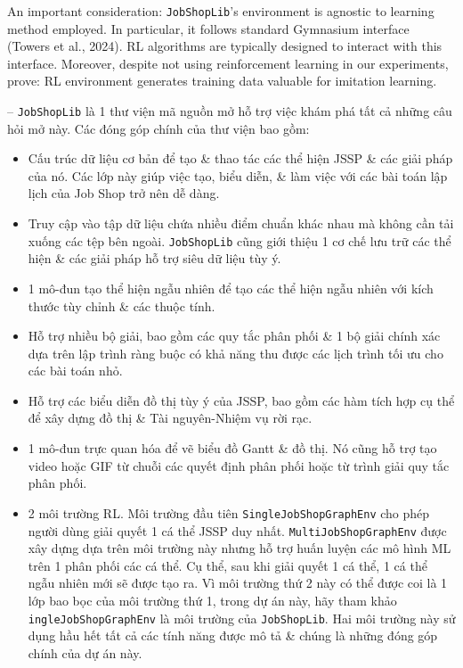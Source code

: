 \documentclass{article}
\begin{document}
\begin{itemize}
\begin{itemize}
\begin{itemize}
\begin{itemize}
            \end{itemize}
            An important consideration: {\tt JobShopLib}'s environment is agnostic to learning method employed. In particular, it follows standard Gymnasium interface (Towers et al., 2024). RL algorithms are typically designed to interact with this interface. Moreover, despite not using reinforcement learning in our experiments, prove: RL environment generates training data valuable for imitation learning.

            -- {\tt JobShopLib} là 1 thư viện mã nguồn mở hỗ trợ việc khám phá tất cả những câu hỏi mở này. Các đóng góp chính của thư viện bao gồm:
            \begin{itemize}
                \item Cấu trúc dữ liệu cơ bản để tạo \& thao tác các thể hiện JSSP \& các giải pháp của nó. Các lớp này giúp việc tạo, biểu diễn, \& làm việc với các bài toán lập lịch của Job Shop trở nên dễ dàng.
                \item Truy cập vào tập dữ liệu chứa nhiều điểm chuẩn khác nhau mà không cần tải xuống các tệp bên ngoài. {\tt JobShopLib} cũng giới thiệu 1 cơ chế lưu trữ các thể hiện \& các giải pháp hỗ trợ siêu dữ liệu tùy ý.
                \item 1 mô-đun tạo thể hiện ngẫu nhiên để tạo các thể hiện ngẫu nhiên với kích thước tùy chỉnh \& các thuộc tính.
                \item Hỗ trợ nhiều bộ giải, bao gồm các quy tắc phân phối \& 1 bộ giải chính xác dựa trên lập trình ràng buộc có khả năng thu được các lịch trình tối ưu cho các bài toán nhỏ.
                \item Hỗ trợ các biểu diễn đồ thị tùy ý của JSSP, bao gồm các hàm tích hợp cụ thể để xây dựng đồ thị \& Tài nguyên-Nhiệm vụ rời rạc.
                \item 1 mô-đun trực quan hóa để vẽ biểu đồ Gantt \& đồ thị. Nó cũng hỗ trợ tạo video hoặc GIF từ chuỗi các quyết định phân phối hoặc từ trình giải quy tắc phân phối.
                \item 2 môi trường RL. Môi trường đầu tiên {\tt SingleJobShopGraphEnv} cho phép người dùng giải quyết 1 cá thể JSSP duy nhất. {\tt MultiJobShopGraphEnv} được xây dựng dựa trên môi trường này nhưng hỗ trợ huấn luyện các mô hình ML trên 1 phân phối các cá thể. Cụ thể, sau khi giải quyết 1 cá thể, 1 cá thể ngẫu nhiên mới sẽ được tạo ra. Vì môi trường thứ 2 này có thể được coi là 1 lớp bao bọc của môi trường thứ 1, trong dự án này, hãy tham khảo {\tt ingleJobShopGraphEnv} là môi trường của {\tt JobShopLib}. Hai môi trường này sử dụng hầu hết tất cả các tính năng được mô tả \& chúng là những đóng góp chính của dự án này.

\end{itemize}
\end{itemize}
\end{itemize}
\end{itemize}
\end{document}
